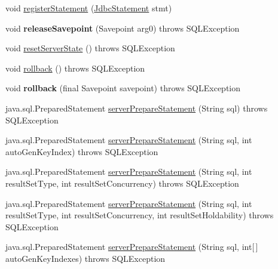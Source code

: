 \begin{DoxyCompactItemize}
\item 
void \mbox{\hyperlink{classcom_1_1mysql_1_1cj_1_1jdbc_1_1_connection_impl_a34559497cf5a4650696890f1de8a0a78}{register\+Statement}} (\mbox{\hyperlink{interfacecom_1_1mysql_1_1cj_1_1jdbc_1_1_jdbc_statement}{Jdbc\+Statement}} stmt)
\item 
\mbox{\label{classcom_1_1mysql_1_1cj_1_1jdbc_1_1_connection_impl_a8fb92c8ea1c85d236a54bb88bafb7349}} 
void {\bfseries release\+Savepoint} (Savepoint arg0)  throws S\+Q\+L\+Exception 
\item 
void \mbox{\hyperlink{classcom_1_1mysql_1_1cj_1_1jdbc_1_1_connection_impl_adccdf6ec2e52545cff1a649ccecbdd62}{reset\+Server\+State}} ()  throws S\+Q\+L\+Exception 
\item 
void \mbox{\hyperlink{classcom_1_1mysql_1_1cj_1_1jdbc_1_1_connection_impl_adb29692483164e8c98dbeb9c6eb5a972}{rollback}} ()  throws S\+Q\+L\+Exception 
\item 
\mbox{\label{classcom_1_1mysql_1_1cj_1_1jdbc_1_1_connection_impl_aed6d6c03e9c55548e5b235562ed5f9f3}} 
void {\bfseries rollback} (final Savepoint savepoint)  throws S\+Q\+L\+Exception 
\item 
java.\+sql.\+Prepared\+Statement \mbox{\hyperlink{classcom_1_1mysql_1_1cj_1_1jdbc_1_1_connection_impl_ad91b5892ca4cc22ca40b2421171b0078}{server\+Prepare\+Statement}} (String sql)  throws S\+Q\+L\+Exception 
\item 
java.\+sql.\+Prepared\+Statement \mbox{\hyperlink{classcom_1_1mysql_1_1cj_1_1jdbc_1_1_connection_impl_abd651a25d34961e6b9e8b5938f57222f}{server\+Prepare\+Statement}} (String sql, int auto\+Gen\+Key\+Index)  throws S\+Q\+L\+Exception 
\item 
java.\+sql.\+Prepared\+Statement \mbox{\hyperlink{classcom_1_1mysql_1_1cj_1_1jdbc_1_1_connection_impl_a4d739eb2f2ef627fd61b4da1a57c94b5}{server\+Prepare\+Statement}} (String sql, int result\+Set\+Type, int result\+Set\+Concurrency)  throws S\+Q\+L\+Exception 
\item 
java.\+sql.\+Prepared\+Statement \mbox{\hyperlink{classcom_1_1mysql_1_1cj_1_1jdbc_1_1_connection_impl_a993fa4ecbf826575370653501a64d7fb}{server\+Prepare\+Statement}} (String sql, int result\+Set\+Type, int result\+Set\+Concurrency, int result\+Set\+Holdability)  throws S\+Q\+L\+Exception 
\item 
java.\+sql.\+Prepared\+Statement \mbox{\hyperlink{classcom_1_1mysql_1_1cj_1_1jdbc_1_1_connection_impl_a19b32ebaabe6dbd19ce2dd4ca4b3e5eb}{server\+Prepare\+Statement}} (String sql, int\mbox{[}$\,$\mbox{]} auto\+Gen\+Key\+Indexes)  throws S\+Q\+L\+Exception 

\end{DoxyCompactItemize}

